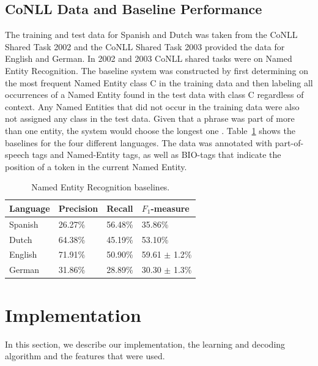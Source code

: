 \documentclass[11pt]{article}
\begin{document}
\subsection{CoNLL Data and Baseline Performance}
The training and test data for Spanish and Dutch was taken from the CoNLL Shared Task 2002 \cite{tksintro} and 
the CoNLL Shared Task 2003 \cite{TjongKimSang:2003:ICS:1119176.1119195} provided the data for English and German.
In 2002 and 2003 CoNLL shared tasks were on Named Entity Recognition. The baseline system was constructed by first determining
on the most frequent Named Entity class C in the training data and then labeling all occurrences of a Named Entity found in the test data with class C regardless of context. 
Any Named Entities that did not occur in the training data were also not assigned any class in the test data.
Given that a phrase was part of more than one entity, the system would choose the longest one \cite{TjongKimSang:2003:ICS:1119176.1119195}.
Table~\ref{table:Base} shows the baselines for the four different languages.  
The data was annotated with part-of-speech tags and Named-Entity tags, as well as BIO-tags that indicate the position of a token in the current Named Entity. %


\begin{table}[h!]
\small
\begin{tabular}{|l|l|l|l|}
\hline
\bf Language & \bf Precision & \bf Recall & \bf $F_1$-measure \\ \hline
Spanish &             26.27\% & 56.48\% & 35.86\%        \\
Dutch  &             64.38\%  &45.19\%    & 53.10\%  \\
English &              71.91\%& 50.90\%  & 59.61 $\pm$ 1.2\%\\
German &      31.86\%  & 28.89\% & 30.30  $\pm$ 1.3\% \\
\hline
\end{tabular}
\caption{Named Entity Recognition baselines.}
\label{table:Base}
\end{table}



\section{Implementation}
In this section, we describe our implementation, the learning and decoding algorithm and the features that were used.
\end{document}
